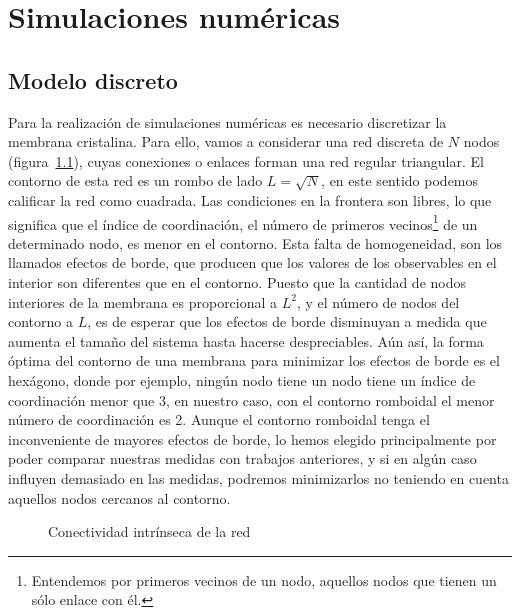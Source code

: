 \chapter{Simulaciones numéricas}

\section{Modelo discreto}

Para la realización de simulaciones numéricas es necesario discretizar la
membrana cristalina. Para ello, vamos a considerar una red 
discreta de $N$ nodos (figura~\ref{red_rombo}), cuyas conexiones o enlaces
forman una red regular triangular. El contorno de esta red es un rombo de lado
$L=\sqrt{N}$, en este sentido podemos calificar la red como cuadrada. 
Las condiciones en la frontera son libres, lo que significa que el índice de
coordinación, el número de primeros vecinos\footnote{Entendemos por primeros
  vecinos de un nodo, aquellos nodos que tienen un sólo enlace con él.} de un
determinado nodo, es menor en el contorno. Esta falta de homogeneidad,
son los llamados efectos de borde, que producen que los valores 
de los observables en el interior son diferentes que en el contorno. Puesto
que la cantidad de nodos interiores de la membrana es proporcional a $L^2$, y
el número de nodos del contorno a $L$, es de esperar que los efectos de borde
disminuyan a medida que aumenta el tamaño del sistema hasta hacerse
despreciables. Aún así, la forma óptima del contorno de una
membrana para minimizar los efectos de borde es el hexágono, donde por
ejemplo, ningún nodo tiene un nodo tiene un índice de coordinación menor que
3, en nuestro caso, con el contorno romboidal el menor número de coordinación
es 2. Aunque el contorno romboidal tenga el inconveniente de mayores efectos
de borde, lo hemos elegido principalmente por poder comparar nuestras medidas
con trabajos anteriores, y si en algún caso influyen
demasiado en las medidas, podremos minimizarlos no teniendo en cuenta
aquellos nodos cercanos al contorno.

\begin{figure}[h]\label{red_rombo}
\centering
\resizebox{275bp}{!}{}
\caption{Conectividad intrínseca de la red}
\end{figure}

